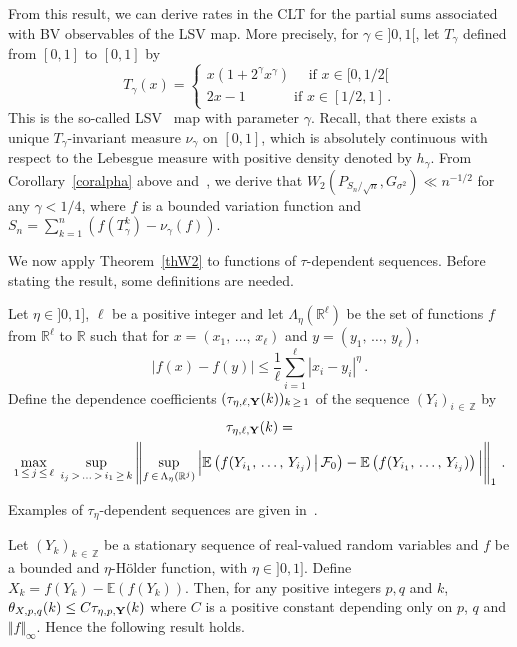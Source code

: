 \documentclass[AHL,Unicode,longabstracts,published]{cedram}
\newcommand{\bbE}{\mathbb{E}}
\newcommand{\bbZ}{\mathbb{Z}}
\newcommand{\clF}{\mathcal{F}}
\newcommand{\bbR}{\mathbb{R}}
\begin{document}
From this result, we can derive rates in the CLT for the partial sums associated with BV observables of the LSV map. More precisely, for $\gamma \in]0,1[$, let $T_\gamma$ defined from $[0,1]$ to $[0,1]$ by
\begin{equation*}
T_\gamma(x)=
\begin{cases}
x(1+ 2^{\gamma}x^{\gamma}) \quad \text{ if }x \in [0, 1/2[ \\
2x-1 \quad \quad \quad \ \ \text{if }x \in [1/2, 1] \,.
\end{cases}
\end{equation*}
This is the so-called LSV~\cite{LSV} map with parameter $\gamma$. Recall, that there exists a unique $T_\gamma$-invariant measure $\nu_\gamma$ on $[0, 1]$, which is absolutely continuous with respect to the Lebesgue measure with positive density denoted by $h_\gamma$. From Corollary~\ref{coralpha} above and~\cite[Prop.~1.17]{DGM10}, we derive that $ W_2 (P_{S_n / {\sqrt n} }, G_{\sigma^2}) \ll n^{-1/2}$ for any $\gamma < 1/4$, where $f$ is a bounded variation function and $S_n = \sum_{k=1}^n (f(T^k_{\gamma}) -\nu_\gamma (f))$.


We now apply Theorem~\ref{thW2} to functions of $\tau$-dependent sequences. Before stating the result, some definitions are needed.

\begin{defi}
Let $\eta \in]0, 1]$, $\ell$ be a positive integer and let $\Lambda_\eta(\bbR^\ell)$ be the set of functions $f$ from $\bbR^\ell$ to $\bbR$ such that for $x = (x_1,\,\dots,\,x_\ell)$ and $y = (y_1,\,\dots,\,y_\ell)$,
\[
\left|f(x)-f(y)\right|\leq \frac{1}{\ell} \sum_{i=1}^{\ell} |x_i-y_i|^{\eta} \,.
\]
Define the dependence coefficients $(\tau_{\eta, \ell,{\bf Y}} (k))_{k\, \geq\,1}$ of the sequence $(Y_i)_{i\,\in\,\bbZ}$ by
\begin{multline*}
\tau_{\eta,\ell,{\bf Y}} (k) =\\
\max_{1 \,\leq\,j\,\leq\,\ell}\; \sup_{i_j\,>\,\ldots\,>\,i_1\,\geq\,k} \left \| \sup_{f\,\in\,\Lambda_\eta(\bbR^j)}\Big |\bbE \left(f(Y_{i_1},\,\dots,\,Y_{i_j}) \,\middle|\,\clF_0\right)-\bbE\left(f(Y_{i_1}, \,\dots,\,Y_{i_j})\right)\Big | \right\|_1 \,.
\end{multline*}
\end{defi}

Examples of $\tau_\eta$-dependent sequences are given in~\cite{DP05}.


Let $(Y_k)_{k\,\in\,\bbZ}$ be a stationary sequence of real-valued random variables and $f$ be a bounded and $\eta$-H\"older function, with $\eta \in]0,1]$. Define $X_k = f(Y_k) - \bbE (f(Y_k))$. Then, for any positive integers $p,q$ and $k$, $\theta_{X, p,q } (k) \leq C \tau_{\eta, p,{\bf Y}} (k) $ where $C$ is a positive constant depending only on $p$, $q$ and $\Vert f \Vert_{\infty}$. Hence the following result holds.
\end{document}
